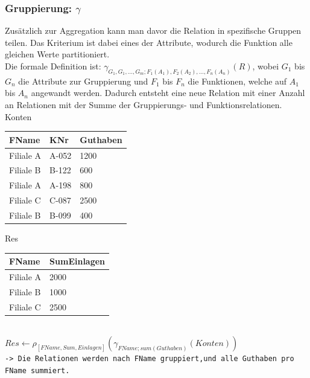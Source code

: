 \documentclass{article}
\begin{document}
	\subsubsection{Gruppierung: \texorpdfstring{$\gamma$}{}}
 	Zusätzlich zur Aggregation kann man davor die Relation in spezifische Gruppen teilen. Das Kriterium ist dabei eines der Attribute, wodurch die Funktion alle gleichen Werte partitioniert. \\
 	Die formale Definition ist: $\gamma_{G_1, G_1, ..., G_m;F_1(A_1),F_2(A_2),...,F_n(A_n)}(R)$, wobei $G_1$ bis $G_n$ die Attribute zur Gruppierung und $F_1$ bis $F_n$ die Funktionen, welche auf $A_1$ bis $A_n$ angewandt werden. Dadurch entsteht eine neue Relation mit einer Anzahl an Relationen mit der Summe der Gruppierungs- und Funktionsrelationen. \\
 	Konten
 	\begin{tabular}{| l | l | l |}
 		\toprule
 		FName & KNr & Guthaben \\ \midrule
 		Filiale A & A-052 & 1200 \\
 		Filiale B & B-122 & 600 \\
 		Filiale A & A-198 & 800 \\
 		Filiale C & C-087 & 2500 \\
  	Filiale B & B-099 & 400 \\
 		\bottomrule
 \end{tabular} \hspace{0.5cm}
 Res
 	\begin{tabular}{| l | l |}
 		\toprule
 		FName & SumEinlagen \\ \midrule
 		Filiale A & 2000 \\
 		Filiale B & 1000 \\
 		Filiale C & 2500 \\
 		\bottomrule
 \end{tabular} \\ 
 $Res \gets\rho_{[FName,Sum,Einlagen]}(\gamma_{FName;sum(Guthaben)}(Konten))$ \\ 
 \verb|-> Die Relationen werden nach FName gruppiert,und alle Guthaben pro FName summiert.|
\end{document}
